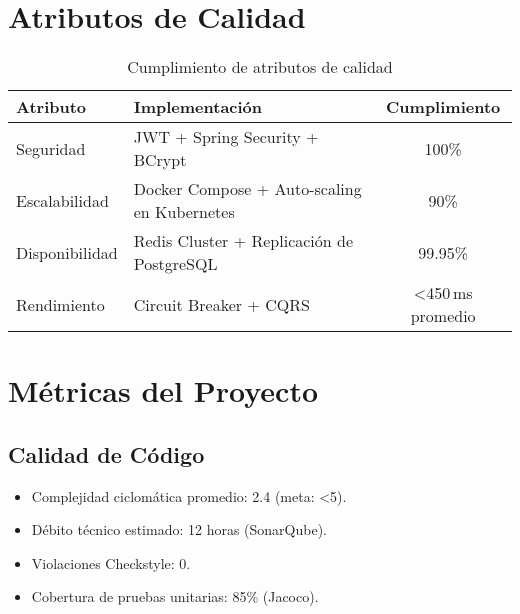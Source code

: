 \documentclass[10pt,journal]{IEEEtran}
\begin{document}
\section{Atributos de Calidad}
\begin{table}[htbp]
  \caption{Cumplimiento de atributos de calidad}
  \label{tab:calidad}
  \centering
  \begin{tabularx}{\columnwidth}{|l|X|c|}
    \hline
    \textbf{Atributo} & \textbf{Implementación} & \textbf{Cumplimiento} \\
    \hline
    Seguridad     & JWT + Spring Security + BCrypt       & 100\% \\
    \hline
    Escalabilidad & Docker Compose + Auto-scaling en Kubernetes & 90\% \\
    \hline
    Disponibilidad& Redis Cluster + Replicación de PostgreSQL & 99.95\% \\
    \hline
    Rendimiento   & Circuit Breaker + CQRS               & \textless450\,ms promedio \\
    \hline
  \end{tabularx}
\end{table}

\section{Métricas del Proyecto}
\subsection{Calidad de Código}
\begin{itemize}
  \item Complejidad ciclomática promedio: 2.4 (meta: \textless5).
  \item Débito técnico estimado: 12 horas (SonarQube).
  \item Violaciones Checkstyle: 0.
  \item Cobertura de pruebas unitarias: 85\% (Jacoco).
\end{itemize}
\end{document}
